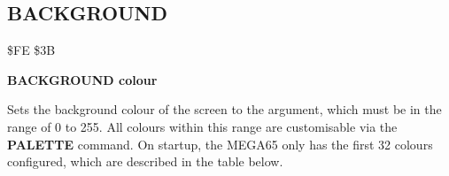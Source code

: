 \subsection{BACKGROUND}
\begin{description}[leftmargin=2cm,style=nextline]
\item [Token:] \$FE \$3B
\item [Format:] {\bf BACKGROUND colour}
\item [Usage:] Sets the background colour
               of the screen to the argument, which must be in the
               range of 0 to 255. All colours within this range are
               customisable via the {\bf PALETTE} command. On
               startup, the MEGA65 only has the first 32 colours configured,
               which are described in the table below.


\end{description}
